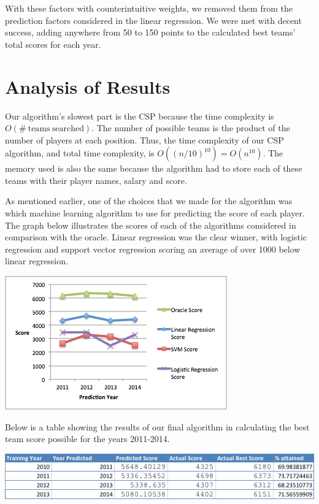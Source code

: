 \documentclass[12pt]{amsart}
\begin{document}
With these factors with counterintuitive weights, we removed them from the prediction factors considered in the linear regression. We were met with decent success, adding anywhere from 50 to 150 points to the calculated best teams' total scores for each year.
\section{\large Analysis of Results} \label{error}
Our algorithm's slowest part is the CSP because the time complexity is $O(\#\ \mathrm{teams}\ \mathrm{searched})$. The number of possible teams is the product of the number of players at each position. Thus, the time complexity of our CSP algorithm, and total time complexity, is $O((n/10)^10) = O(n^10)$. The memory used is also the same because the algorithm had to store each of these teams with their player names, salary and score.
\vspace{.4cm}

As mentioned earlier, one of the choices that we made for the algorithm was which machine learning algorithm to use for predicting the score of each player. The graph below illustrates the scores of each of the algorithms considered in comparison with the oracle. Linear regression was the clear winner, with logistic regression and support vector regression scoring an average of over 1000 below linear regression.
\vspace{.4cm}
\begin{center}
\includegraphics[scale=0.9]{graphimage.png}
\end{center}

Below is a table showing the results of our final algorithm in calculating the best team score possible for the years 2011-2014. 
\vspace{.4cm}
\begin{center}
\includegraphics[scale=0.8]{table.png}
\end{center}
\vspace{.4cm}
\end{document}

